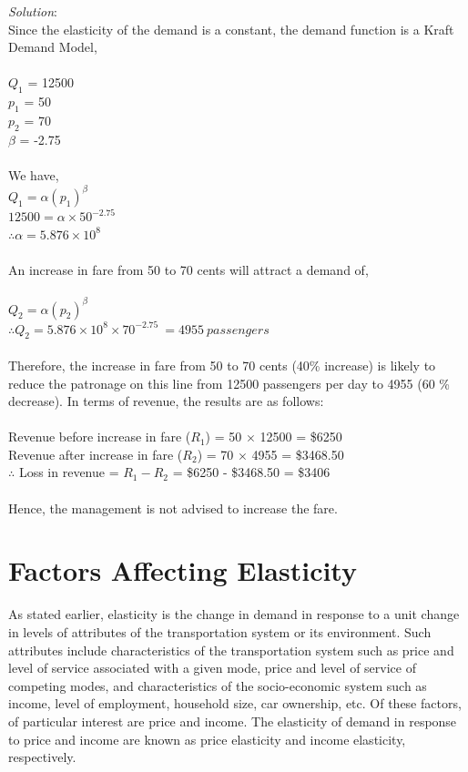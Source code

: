 \textit{Solution}:\\
Since the elasticity of the demand is a constant, the demand function is a Kraft Demand Model,\\\\
$Q_1$ = 12500\\
$p_1$ = 50\\
$p_2$ = 70\\
$\beta$ = -2.75\\\\
We have,\\
$ Q_1 = \alpha (p_1)^\beta$\\
$ 12500 = \alpha \times 50^{-2.75}$\\
$\therefore \alpha = 5.876 \times 10^{8}$\\\\
An increase in fare from 50 to 70 cents will attract a demand of,\\\\
$ Q_2 = \alpha (p_2)^\beta$\\
$ \therefore Q_2 = 5.876 \times 10^{8} \times 70^{-2.75} \: = 4955 \: passengers$\\\\
Therefore, the increase in fare from 50 to 70 cents (40\% increase) is likely to reduce the patronage on this line from 12500 passengers per day to 4955 (60 \% decrease). In terms of revenue, the results are as follows:\\\\
Revenue before increase in fare ($R_1$) = 50 $\times$ 12500 = \$6250\\
Revenue after increase in fare ($R_2$) = 70 $\times$ 4955 = \$3468.50\\
$\therefore$ Loss in revenue = $ R_1 - R_2$ = \$6250 - \$3468.50 = \$3406\\\\
Hence, the management is not advised to increase the fare.
%
\section{Factors Affecting Elasticity}
As stated earlier, elasticity is the change in demand in response to a unit change in levels of attributes of the transportation system or its environment. Such attributes include characteristics of the transportation system such as price and level of service associated with a given mode, price and level of service of competing modes, and characteristics of the socio-economic system such as income, level of employment, household size, car ownership, etc. Of these factors, of particular interest are price and income. The elasticity of demand in response to price and income are known as price elasticity and income elasticity, respectively.
